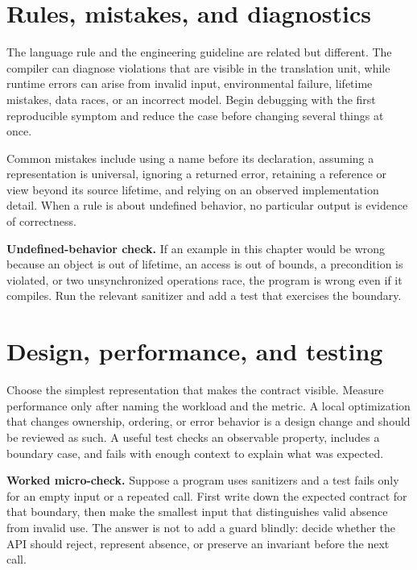 \section{Rules, mistakes, and diagnostics}
The language rule and the engineering guideline are related but different. The compiler can diagnose violations that are visible in the translation unit, while runtime errors can arise from invalid input, environmental failure, lifetime mistakes, data races, or an incorrect model. Begin debugging with the first reproducible symptom and reduce the case before changing several things at once.

Common mistakes include using a name before its declaration, assuming a representation is universal, ignoring a returned error, retaining a reference or view beyond its source lifetime, and relying on an observed implementation detail. When a rule is about undefined behavior, no particular output is evidence of correctness.

\begin{warning}
\textbf{Undefined-behavior check.} If an example in this chapter would be wrong because an object is out of lifetime, an access is out of bounds, a precondition is violated, or two unsynchronized operations race, the program is wrong even if it compiles. Run the relevant sanitizer and add a test that exercises the boundary.
\end{warning}

\section{Design, performance, and testing}
Choose the simplest representation that makes the contract visible. Measure performance only after naming the workload and the metric. A local optimization that changes ownership, ordering, or error behavior is a design change and should be reviewed as such. A useful test checks an observable property, includes a boundary case, and fails with enough context to explain what was expected.

\begin{worked}
\textbf{Worked micro-check.} Suppose a program uses sanitizers and a test fails only for an empty input or a repeated call. First write down the expected contract for that boundary, then make the smallest input that distinguishes valid absence from invalid use. The answer is not to add a guard blindly: decide whether the API should reject, represent absence, or preserve an invariant before the next call.
\end{worked}

